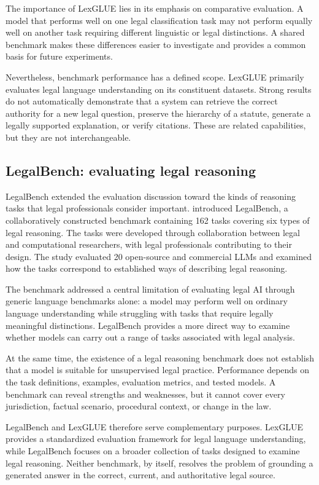 The importance of LexGLUE lies in its emphasis on comparative evaluation. A model that performs well
on one legal classification task may not perform equally well on another task requiring different
linguistic or legal distinctions. A shared benchmark makes these differences easier to investigate
and provides a common basis for future experiments.

Nevertheless, benchmark performance has a defined scope. LexGLUE primarily evaluates legal language
understanding on its constituent datasets. Strong results do not automatically demonstrate that a
system can retrieve the correct authority for a new legal question, preserve the hierarchy of a
statute, generate a legally supported explanation, or verify citations. These are related
capabilities, but they are not interchangeable.

\subsection{LegalBench: evaluating legal reasoning}

LegalBench extended the evaluation discussion toward the kinds of reasoning tasks that legal
professionals consider important. \citet{guha2023} introduced LegalBench, a collaboratively
constructed benchmark containing 162 tasks covering six types of legal reasoning. The tasks were
developed through collaboration between legal and computational researchers, with legal professionals
contributing to their design. The study evaluated 20 open-source and commercial LLMs and examined how
the tasks correspond to established ways of describing legal reasoning.

The benchmark addressed a central limitation of evaluating legal AI through generic language
benchmarks alone: a model may perform well on ordinary language understanding while struggling with
tasks that require legally meaningful distinctions. LegalBench provides a more direct way to examine
whether models can carry out a range of tasks associated with legal analysis.

At the same time, the existence of a legal reasoning benchmark does not establish that a model is
suitable for unsupervised legal practice. Performance depends on the task definitions, examples,
evaluation metrics, and tested models. A benchmark can reveal strengths and weaknesses, but it cannot
cover every jurisdiction, factual scenario, procedural context, or change in the law.

LegalBench and LexGLUE therefore serve complementary purposes. LexGLUE provides a standardized
evaluation framework for legal language understanding, while LegalBench focuses on a broader
collection of tasks designed to examine legal reasoning. Neither benchmark, by itself, resolves the
problem of grounding a generated answer in the correct, current, and authoritative legal source.

